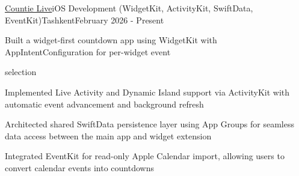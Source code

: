 \begin{resume_employer}{\href{https://apps.apple.com/us/app/countie-live/id6761603292}{Countie Live}}{iOS Development (WidgetKit, ActivityKit, SwiftData, EventKit)}{Tashkent}{February 2026 - Present}
  \item Built a widget-first countdown app using WidgetKit with AppIntentConfiguration for per-widget event 
  
  selection
  \item Implemented Live Activity and Dynamic Island support via ActivityKit with automatic event advancement and background refresh                                                                                                              
  \item Architected shared SwiftData persistence layer using App Groups for seamless data access between the main app and widget extension
  \item Integrated EventKit for read-only Apple Calendar import, allowing users to convert calendar events into countdowns 
\end{resume_employer} 
